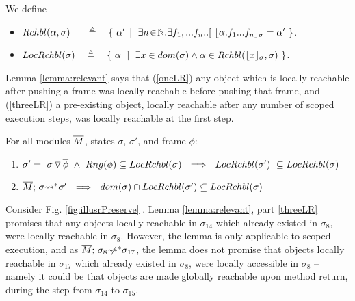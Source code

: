 {\begin{definition} We define 
\begin{itemize}
\item
{{$\Relevant {\alpha} {\sigma}  \ \ \ \ \ \triangleq \ \  \  \{ \ \alpha' \, \mid \ \exists n\!\in\!\mathbb{N}.\exists f_1,...f_n.. [\ \interpret {\sigma} {\alpha.f_1...f_n} = \alpha'\ \}$}}.
\item
$ \LRelevantO   \sigma  \ \  \ \triangleq \ \  \  \{ \ \alpha \ \mid \ { \exists x\in dom(\sigma) \wedge \alpha \in \Relevant {\interpret  {\sigma} x}
{\sigma} \ \} } $.
\end{itemize}
\end{definition}

 
Lemma  \ref{lemma:relevant} %
says that 
(\ref{oneLR}) any object which is locally reachable after pushing a frame was locally reachable before pushing that frame, and 
(\ref{threeLR}) a pre-existing object, locally reachable after any number of scoped execution steps, was locally reachable at the first step.

\begin{lemma}
\label{lemma:relevant}
\label{lemma:push:N}
For all modules $\overline{M}$, states $\sigma$, $\sigma'$,   and frame $\phi$:
\begin{enumerate}
\item
\label{oneLR}
{$ \sigma'= \PushS {\phi} {\sigma}   \ \wedge  \  {Rng(\phi)} \subseteq \LRelevantO  {\sigma} 
 \ \  \Longrightarrow\ \ \LRelevantO {\sigma'}\  \subseteq \LRelevantO   {\sigma}$}
\item
\label{threeLR}
{${\leadstoBoundedStar {\Mtwo}  {\sigma}    {\sigma'}}  \ \  \Longrightarrow\ \ 
dom(\sigma) \cap \LRelevantO {\sigma'} \subseteq   \LRelevantO {\sigma}$
}

\end{enumerate}
\end{lemma}

{Consider Fig.  \ref{fig:illusrPreserve} . %
Lemma \ref{lemma:relevant}, part \ref{threeLR}  promises that any objects locally reachable in $\sigma_{14}$ which already existed in $\sigma_{8}$, were locally reachable in $\sigma_{8}$. However, the lemma is only  applicable to scoped execution, and as 
$\overline{M};\, {\sigma_8} \not\!\!\!{\rightsquigarrow^*} \sigma_{17}$, 
the lemma does not promise that  objects locally reachable in $\sigma_{17}$ which already existed in $\sigma_{8}$, were locally accessible in $\sigma_{8}$ -- namely it could be that objects are made globally reachable upon method return, during the step from $\sigma_{14}$ to $\sigma_{15}$.}

}
